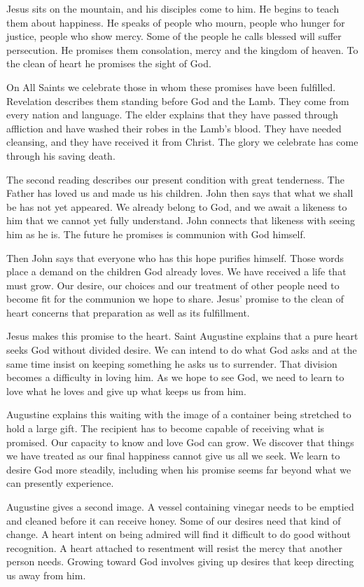 Jesus sits on the mountain, and his disciples come to him. He begins to teach them about happiness. He speaks of people who mourn, people who hunger for justice, people who show mercy. Some of the people he calls blessed will suffer persecution. He promises them consolation, mercy and the kingdom of heaven. To the clean of heart he promises the sight of God.

On All Saints we celebrate those in whom these promises have been fulfilled. Revelation describes them standing before God and the Lamb. They come from every nation and language. The elder explains that they have passed through affliction and have washed their robes in the Lamb's blood. They have needed cleansing, and they have received it from Christ. The glory we celebrate has come through his saving death.

The second reading describes our present condition with great tenderness. The Father has loved us and made us his children. John then says that what we shall be has not yet appeared. We already belong to God, and we await a likeness to him that we cannot yet fully understand. John connects that likeness with seeing him as he is. The future he promises is communion with God himself.

Then John says that everyone who has this hope purifies himself. Those words place a demand on the children God already loves. We have received a life that must grow. Our desire, our choices and our treatment of other people need to become fit for the communion we hope to share. Jesus' promise to the clean of heart concerns that preparation as well as its fulfillment.

Jesus makes this promise to the heart. Saint Augustine explains that a pure heart seeks God without divided desire. We can intend to do what God asks and at the same time insist on keeping something he asks us to surrender. That division becomes a difficulty in loving him. As we hope to see God, we need to learn to love what he loves and give up what keeps us from him.

Augustine explains this waiting with the image of a container being stretched to hold a large gift. The recipient has to become capable of receiving what is promised. Our capacity to know and love God can grow. We discover that things we have treated as our final happiness cannot give us all we seek. We learn to desire God more steadily, including when his promise seems far beyond what we can presently experience.

Augustine gives a second image. A vessel containing vinegar needs to be emptied and cleaned before it can receive honey. Some of our desires need that kind of change. A heart intent on being admired will find it difficult to do good without recognition. A heart attached to resentment will resist the mercy that another person needs. Growing toward God involves giving up desires that keep directing us away from him.

